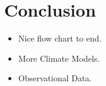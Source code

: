 %
\section{Conclusion}
\label{sec:8_Conclusion}

\begin{itemize}
\item Nice flow chart to end.
\item More Climate Models.
\item Observational Data.
\end{itemize}

%
